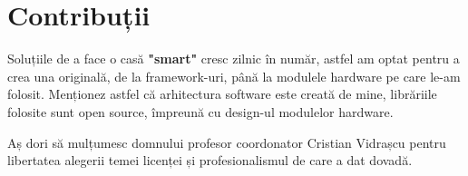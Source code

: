 \chapter*{Contribuții}
Soluțiile de a face o casă \textbf{"smart"} cresc zilnic în număr, astfel am optat pentru a crea una originală, de la framework-uri, până la modulele hardware pe care le-am folosit. Menționez astfel că arhitectura software este creată de mine, librăriile folosite sunt open source, împreună cu design-ul modulelor hardware.

Aș dori să mulțumesc domnului profesor coordonator Cristian Vidrașcu pentru libertatea alegerii temei licenței și profesionalismul de care a dat dovadă.
